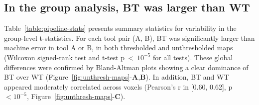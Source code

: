 \documentclass[11pt,onecolumn]{article}
\begin{document}
\subsection{In the group analysis, BT was larger than WT}

Table~\ref{table:pipeline-stats} presents summary statistics for variability in the
group-level t-statistics. For each tool pair (A, B), BT  was
significantly larger than machine error in tool A or B, in both thresholded
and unthresholded maps (Wilcoxon signed-rank test and t-test p~\textless~$10^{-5}$ for all tests).
These global differences were confirmed by Bland-Altman plots showing a
clear dominance of BT over WT
(Figure~\ref{fig:unthresh-maps}-\textbf{A},\textbf{B}).
In addition, BT and WT appeared moderately correlated across voxels (Pearson's r
in [0.60, 0.62], p$< 10^{-5}$, Figure~\ref{fig:unthresh-maps}-\textbf{C}). 
\end{document}
